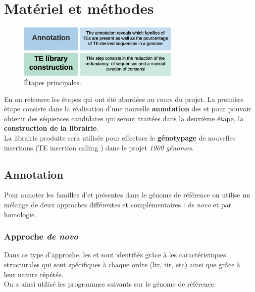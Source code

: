 \documentclass[10pt]{article}
\begin{document}
\newpage

\section{Matériel et méthodes}

\bigskip

\begin{figure}[H]
    \centering
    \includegraphics[width=0.7\textwidth]{img/misc/main_steps.eps}
    \caption{\'Etapes principales.}
    \label{fig:main_steps}
\end{figure}

\bigskip

En \figureautorefname{ \ref{fig:main_steps}} on retrouve les étapes qui ont été abordées au cours du projet. La première étape consiste dans la réalisation d'une nouvelle \textbf{annotation} des \acrlong{et} pour pouvoir obtenir des séquences candidates qui seront traitées dans la deuxième étape, la \textbf{construction de la librairie}. \\
La librairie produite sera utilisée pour effectuer le \textbf{génotypage} de nouvelles insertions (\og TE insertion calling \fg{}) dans le projet \textit{1000 génomes}. 

\subsection{Annotation}

Pour annoter les familles d'\acrshort{et} présentes dans le génome de référence on utilise un mélange de deux approches différentes et complémentaires : \textit{de novo} et par homologie. \\

\subsubsection{Approche \textit{de novo}}

Dans ce type d'approche, les \acrshort{et} sont identifiés grâce à les caractéristiques structurales qui sont spécifiques à chaque ordre (\acrshort{ltr}, \acrshort{tir}, etc) ainsi que grâce à leur nature répétée. \\
On a ainsi utilisé les programmes suivants sur le génome de référence: \\
\end{document}

